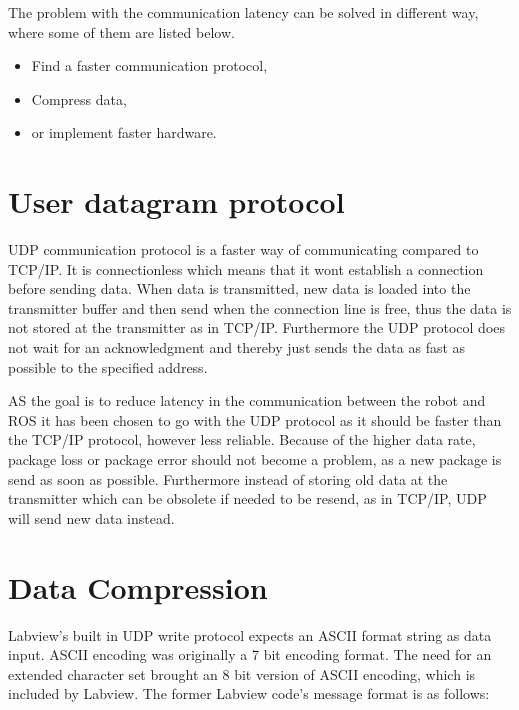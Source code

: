 The problem with the communication latency can be solved in different way, where some of them are listed below.

\begin{itemize}
	\item Find a faster communication protocol,
	\item Compress data,
	\item or implement faster hardware.	
\end{itemize}

\section*{User datagram protocol}
UDP communication protocol is a faster way of communicating compared to TCP/IP. It is connectionless which means that it wont establish a connection before sending data. When data is transmitted, new data is loaded into the transmitter buffer and then send when the connection line is free, thus the data is not stored at the transmitter as in TCP/IP. Furthermore the UDP protocol does not wait for an acknowledgment and thereby just sends the data as fast as possible to the specified address.

AS the goal is to reduce latency in the communication between the robot and ROS it has been chosen to go with the UDP protocol as it should be faster than the TCP/IP protocol, however less reliable. Because of the higher data rate, package loss or package error should not become a problem, as a new package is send as soon as possible. Furthermore instead of storing old data at the transmitter which can be obsolete if needed to be resend, as in TCP/IP, UDP will send new data instead.



\section{Data Compression}\label{data_compress}

Labview's built in UDP write protocol expects an ASCII format string as data input. ASCII encoding was originally a 7 bit encoding format. The need for an extended character set brought an 8 bit version of ASCII encoding, which is included by Labview. The former Labview code's message format is as follows:

